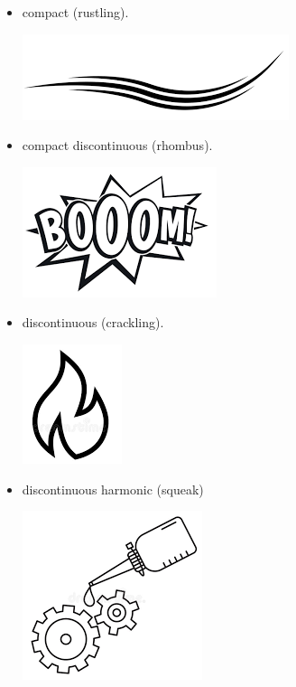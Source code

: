 \begin{itemize}
\begin{itemize}
\begin{itemize}
\begin{center}
      \end{center}
    \item compact (rustling).
      \begin{center}
      \includegraphics[scale=0.1]{../img/fruscio.png}
      \end{center}
    \item compact discontinuous (rhombus).
      \begin{center}
      \includegraphics[scale=0.2]{../img/rombo.png}
      \end{center}
    \item discontinuous (crackling).
      \begin{center}
      \includegraphics[scale=0.22]{../img/crepitio.png}
      \end{center}
    \item discontinuous harmonic (squeak)
      \begin{center}
      \includegraphics[scale=0.22]{../img/cigolio.png}
      \end{center}

\end{itemize}
\end{itemize}
\end{itemize}
